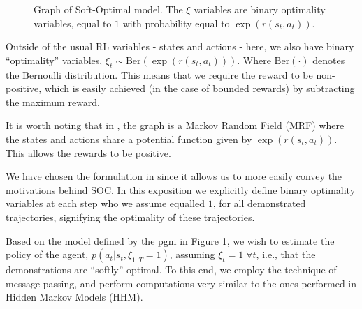 \documentclass{report}
\numberwithin{equation}{section}
\numberwithin{figure}{section}
\numberwithin{table}{section}
\numberwithin{algorithm}{section}
\begin{document}
\begin{figure}[H]
  \centering
  \caption{\label{fig:SOCGraph} Graph of Soft-Optimal model. 
  The $\xi$ variables are binary optimality variables, equal to 
  $1$ with probability equal to $\exp(r(s_t, a_t))$.}
\end{figure}

Outside of the usual RL variables - states and actions - here, 
we also have binary ``optimality'' variables, $\xi_t\sim \text{Ber}(\exp(r(s_t, a_t)))$.
Where $\text{Ber}(\cdot)$ denotes the Bernoulli distribution. 
This means that we require the reward to be non-positive, which 
is easily achieved (in the case of bounded rewards) by subtracting 
the maximum reward.

It is worth noting that 
in \cite{Ziebart2008}, the graph is a Markov Random Field (MRF) 
where the states and actions share a potential function given 
by $\exp(r(s_t, a_t))$. This allows
the rewards to be positive.

We have chosen the formulation in \cite{LevineRLasInf} 
since it allows us to more 
easily convey the motivations behind SOC. In this exposition 
we explicitly define binary optimality variables at each step 
who we assume equalled $1$, for all demonstrated trajectories, 
signifying the optimality of these trajectories.

Based on the model defined by the pgm in Figure \ref{fig:SOCGraph}, 
we wish to estimate the policy of the agent, $p(a_t|s_t, \xi_{1:T}=1)$, 
assuming $\xi_t=1\;\forall t$, 
i.e., that the demonstrations are ``softly'' optimal. 
To this end, we employ the technique of message passing, and perform 
computations very similar to the ones performed in Hidden Markov Models 
(HHM).
\end{document}
